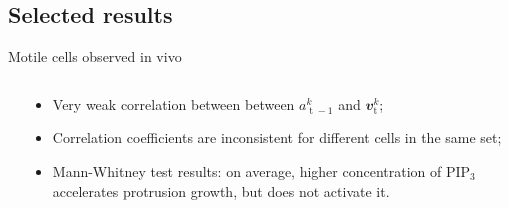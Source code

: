 \documentclass[mathserif,11pt]{beamer}
\DeclareMathOperator{\td}{\mathrm{t}}
\begin{document}
\subsection{Selected results}
\begin{frame}{Motile cells observed in vivo}
\begin{columns}
	\begin{column}{0.48\textwidth}
		\centering
		\scalebox{0.6}{}	
	\end{column}
	\begin{column}{0.52\textwidth}
		\centering
		\begin{itemize}
			\item Very weak correlation between between $a_{\td-1}^{k}$ and $\mathbfit{v}_{\td}^{k}$;
			\item Correlation coefficients are inconsistent for different cells in the same set;
			\item Mann-Whitney test results: on average, higher concentration of PIP$_3$ accelerates protrusion growth, but does not activate it.
		\end{itemize}
	\end{column}
\end{columns}
\end{frame}
\end{document}

